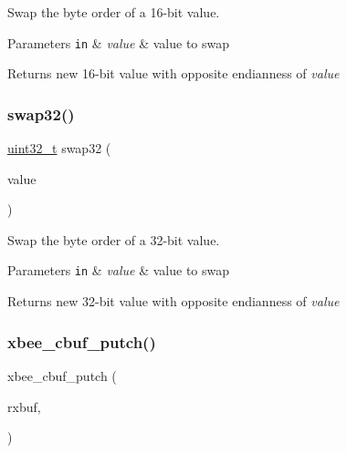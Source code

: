 Swap the byte order of a 16-\/bit value. 


\begin{DoxyParams}[1]{Parameters}
\mbox{\tt in}  & {\em value} & value to swap \\
\hline
\end{DoxyParams}
\begin{DoxyReturn}{Returns}
new 16-\/bit value with opposite endianness of {\itshape value} 
\end{DoxyReturn}
\mbox{\label{group__hal__hcs08_ga5bdbc60a02db00841f567d1ade52f877}} 
\subsubsection{\texorpdfstring{swap32()}{swap32()}}
{\footnotesize\ttfamily \hyperlink{group__hal__dos_ga09a1e304d66d35dd47daffee9731edaa}{uint32\+\_\+t} swap32 (\begin{DoxyParamCaption}\item[{\hyperlink{group__hal__dos_ga09a1e304d66d35dd47daffee9731edaa}{uint32\+\_\+t}}]{value }\end{DoxyParamCaption})}



Swap the byte order of a 32-\/bit value. 


\begin{DoxyParams}[1]{Parameters}
\mbox{\tt in}  & {\em value} & value to swap \\
\hline
\end{DoxyParams}
\begin{DoxyReturn}{Returns}
new 32-\/bit value with opposite endianness of {\itshape value} 
\end{DoxyReturn}
\mbox{\label{group__hal__hcs08_gac4c834cc0ad3ee43af562f658833a6d5}} 
\subsubsection{\texorpdfstring{xbee\+\_\+cbuf\+\_\+putch()}{xbee\_cbuf\_putch()}}
{\footnotesize\ttfamily xbee\+\_\+cbuf\+\_\+putch (\begin{DoxyParamCaption}\item[{E\+M\+B\+E\+R\+\_\+\+S\+E\+R\+I\+A\+L\+\_\+\+P\+O\+R\+T.}]{rxbuf,  }\item[{S\+C\+I2D}]{ }\end{DoxyParamCaption})}




